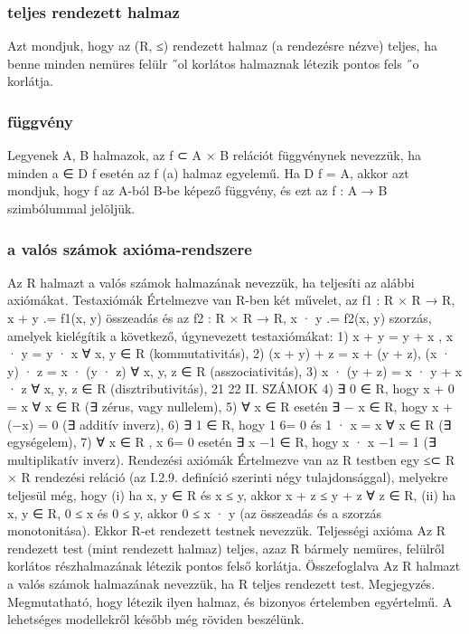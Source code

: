 \documentclass[12pt]{article}
\begin{document}
\subsubsection{teljes rendezett halmaz}

Azt mondjuk, hogy az (R, ≤) rendezett halmaz (a rendezésre nézve) teljes, ha benne
minden nemüres felülr ˝ol korlátos halmaznak létezik pontos fels ˝o korlátja.

\subsubsection{függvény}

Legyenek A, B halmazok, az f ⊂ A × B relációt függvénynek nevezzük, ha minden a ∈ D f esetén az f ({a})
halmaz egyelemű. Ha D f = A, akkor azt mondjuk, hogy f az A-ból B-be képező függvény, és ezt az f : A → B
szimbólummal jelöljük.

\subsubsection{a valós számok axióma-rendszere}

Az R halmazt a valós számok halmazának nevezzük, ha teljesíti az
alábbi axiómákat.
Testaxiómák
Értelmezve van R-ben két művelet, az
f1 : R × R → R, x + y
.= f1(x, y) összeadás és az
f2 : R × R → R, x · y
.= f2(x, y) szorzás,
amelyek kielégítik a következő, úgynevezett testaxiómákat:
1) x + y = y + x , x · y = y · x ∀ x, y ∈ R (kommutativitás),
2) (x + y) + z = x + (y + z), (x · y) · z = x · (y · z)
∀ x, y, z ∈ R (asszociativitás),
3) x · (y + z) = x · y + x · z ∀ x, y, z ∈ R (disztributivitás),
21
22 II. SZÁMOK
4) ∃ 0 ∈ R, hogy x + 0 = x ∀ x ∈ R (∃ zérus, vagy nullelem),
5) ∀ x ∈ R esetén ∃ − x ∈ R, hogy x + (−x) = 0 (∃ additív inverz),
6) ∃ 1 ∈ R, hogy 1 6= 0 és 1 · x = x ∀ x ∈ R (∃ egységelem),
7) ∀ x ∈ R , x 6= 0 esetén ∃ x
−1 ∈ R, hogy x · x
−1 = 1 (∃ multiplikatív
inverz).
Rendezési axiómák
Értelmezve van az R testben egy ≤⊂ R × R rendezési reláció (az I.2.9.
definíció szerinti négy tulajdonsággal), melyekre teljesül még, hogy
(i) ha x, y ∈ R és x ≤ y, akkor x + z ≤ y + z ∀ z ∈ R,
(ii) ha x, y ∈ R, 0 ≤ x és 0 ≤ y, akkor 0 ≤ x · y
(az összeadás és a szorzás monotonitása). Ekkor R-et rendezett testnek
nevezzük.
Teljességi axióma
Az R rendezett test (mint rendezett halmaz) teljes, azaz R bármely nemüres,
felülről korlátos részhalmazának létezik pontos felső korlátja.
Összefoglalva
Az R halmazt a valós számok halmazának nevezzük, ha R teljes rendezett
test.
Megjegyzés. Megmutatható, hogy létezik ilyen halmaz, és bizonyos értelemben
egyértelmű. A lehetséges modellekről később még röviden beszélünk.
\end{document}
